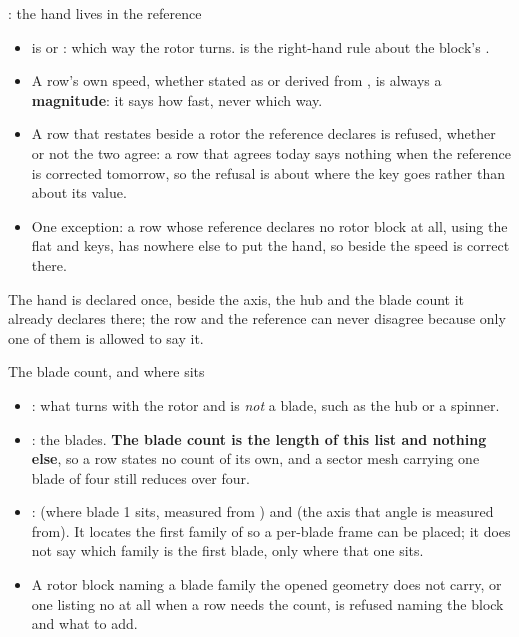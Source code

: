 \begin{frame}{: the hand lives in the reference}
\begin{itemize}\small
  \item {} is  or : which way the rotor
        turns.  is the right-hand rule about the block's
        .
  \item A row's own speed, whether stated as  or derived from
        , is always a \textbf{magnitude}: it says how
        fast, never which way.
  \item A row that restates  beside a rotor the reference
        declares is refused, whether or not the two agree: a row that
        agrees today says nothing when the reference is corrected
        tomorrow, so the refusal is about where the key goes rather than
        about its value.
  \item One exception: a row whose reference declares no rotor block at
        all, using the flat  and 
        keys, has nowhere else to put the hand, so  beside
        the speed is correct there.
\end{itemize}
\begin{ftslimit}
The hand is declared once, beside the axis, the hub and the blade count it
already declares there; the row and the reference can never disagree
because only one of them is allowed to say it.
\end{ftslimit}
\end{frame}

\begin{frame}{The blade count, and where  sits}
\begin{itemize}\small
  \item {}: what turns with the rotor and is
        \emph{not} a blade, such as the hub or a spinner.
  \item {}: the blades. \textbf{The blade count is
        the length of this list and nothing else}, so a row states no
        count of its own, and a sector mesh carrying one blade of four
        still reduces over four.
  \item {}:  (where blade 1 sits, measured
        from ) and  (the axis that angle is measured
        from). It locates the first family of  so
        a per-blade frame can be placed; it does not say which family is
        the first blade, only where that one sits.
  \item A rotor block naming a blade family the opened geometry does not
        carry, or one listing no  at all when a row
        needs the count, is refused naming the block and what to add.
\end{itemize}
\end{frame}

